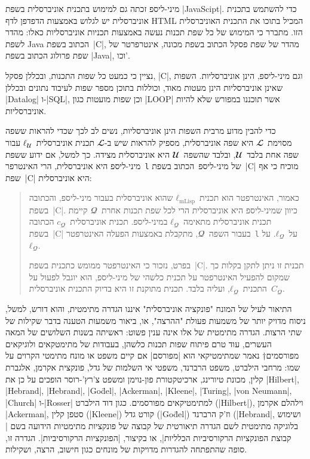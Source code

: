 מיני-ליספ זכתה גם למימוש בתכנית אוניברסלית בשפת \E|JavaScipt|. כדי להשתמש
בתכנית אוניברסלית יש לגלוש באמצעות הדפדפן לדף HTML המכיל בתוכו את התכנית
האוניברסלית הזו. מתברר כי המימוש של כל שפת תכנות נעשה באמצעות תכניות
אוניברסליות כאלו: מהדר לשפת Java הכתוב בשפת~\E|C|, מהדר של שפת פסקל הכתוב בשפת
מכונה, אינטרפרטר של שפת פרולוג הכתוב בשפת \E|Java|, וכו'.

נציין כי כמעט כל שפות התכנות, ובכללן פסקל, \E|C|, וגם מיני-ליספ, הינן
אוניברסליות. השפות שאינן אוניברסליות הינן מעטות מאוד, וכוללות בתוכן
מספר שפות לעיבוד נתונים ובכללן \E|Datalog| ו-\E|SQL|, וכן שפות מועטות כגון
\E|LOOP| אשר תוכננו במפורש שלא להיות אוניברסליות.

כדי להבין מדוע מרבית השפות הינן אוניברסליות, נשים לב לכך שכדי להראות ששפה
מסוימת~$𝓛$ היא שפה אוניברסלית, מספיק להראות שיש ב-$𝓛$ תכנית אוניברסלית~$ℓ_𝓤$
עבור שפה אחת בלבד~$𝓤$, ובלבד שהשפה~$𝓤$ היא אוניברסלית מצידה. כך למשל, אם ידוע
ששפת מיני-ליספ היא אוניברסלית, הרי האינטרפר~\texttt{l} של מיני-ליספ~הכתוב
בשפת~\E|C| מוכיח כי אף שפת~\E|C| היא אוניברסלית:
\begin{quote}
כאמור, האינטרפטר הוא תכנית~$ℓ_{\text{mLisp}}$ שהוא אוניברסלית בעבור מיני-ליספ,
והכתובה בשפת~\E|C|. כיוון שמיני-ליספ היא אוניברסלית הרי לכל שפת תכנות אחרת~$𝓠$
קיימת תכנית אוניברסלית מתאימה~$ℓ_𝓠$ במיני-ליספ. תכנית אוניברסלית~$c_𝓠$ הכתובה
בשפת~\E|C| בעבור השפה~$𝓠$, מתקבלת באמצעות הפעלה האינטרפטר~\texttt{l} על~$ℓ_𝓠$.
על~$ℓ_𝓠$.

בפרט, נזכור כי האינטרפטר ממומש כתכנית בשפת~\E|C|. תכנית זו ניתן לתקן בקלות כך
שמקום להפעיל האינטרפטר על תכנית כלשהי של מיני-ליספ, הוא יוגבל לפעול על
התכנית~$ℓ_𝓠$, ועליה בלבד. תכנית מתוקנת זו היא בדיוק התכנית אוניברסלית~$C_𝓠$.
\end{quote}

התיאור לעיל של המונח "פונקציה אוניברסלית" איננו הגדרה מתימטית, והוא דורש, למשל,
ניסוח מדויק יותר של משמעות פעולת "ההרצה", או, ביאור משמעות הטענה בדבר שקילות
של שתי הרצות. הגדרה מתימטית של אלו אינה ענין פשוט: ראשיתה בשנות השלושים של
המאה העשרים, עוד טרם פיתוח שפות תכנות כלשהן, בעבודות של מתימטקאים ולוגיקאים
מפורסמים†{%
  נאמר שמתימטיקאי הוא \ע|מפורסם| אם קיים משפט או מונח מתימטי הקרוים על שמו:
  מרחבי הילברט, משפט הרברנד, משפטי אי השלמות של גדל, פונקצית אקרמן, אלגברת
  קלין, מכונת טיורינג, ארכיטקטורת פון-נוימן ומשפט צ'רץ'-רוסר הופכים על כן את
  \E|Hilbert|, \E|Hebrand|, \E|Hebrand|, \E|Go\"del|, \E|Ackerman|, \E|Kleene|,
  \E|Turing|, \E|von Neumann|, \E|Church| ו-\E|Rosser| למתימטיקאים מפורסמים.
} כגון דוד הילברט (\E|Hilbert|), וילהלם אקרמן \E|Ackerman|, סטפן קלין
(\E|Kleene|) קורט גדל (\E|Go\"del|) וז'ק הרברנד (\E|Hebrand|, ושימוש בלוגיקה
מתימטית לשם הגדרה תיאורטית של קבוצה של פונקציות מתימטיות הידועה בשם \ע|קבוצת
הפונקציות הרקורסיביות הכלליות|, או בקיצור, \ע|הפונקציות הרקורסיביות|. הגדרה זו,
סופה שהתפתחה להגדרות מדויקות של מונחים כגון חישוב, הרצה, ושקילות.

